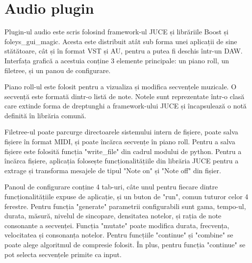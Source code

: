 \documentclass[11pt]{article}
\begin{document}
\section{Audio plugin}
Plugin-ul audio este scris folosind framework-ul JUCE și librăriile  Boost și foleys\_gui\_magic. Acesta este distribuit atât sub forma unei aplicații de sine stătătoare, cât și în format VST și AU, pentru a putea fi deschis într-un DAW. Interfața grafică a acestuia conține 3 elemente principale: un piano roll, un filetree, și un panou de configurare. \par 
Piano roll-ul este folosit pentru a vizualiza și modifica secvențele muzicale. O secvență este formată dintr-o listă de note. Notele sunt reprezentate într-o clasă care extinde forma de dreptunghi a framework-ului JUCE și încapsulează o notă definită în librăria comună. \par
Filetree-ul poate parcurge directoarele sistemului intern de fișiere, poate salva fișiere în format MIDI, și poate încărca secvențe în piano roll. Pentru a salva fișiere este folosită funcția "write\_file" din cadrul modului de python. Pentru a încărca fișiere, aplicația folosește funcționalitățiile din librăria JUCE pentru a extrage și transforma mesajele de tipul "Note on" și "Note off" din fișier. \par
Panoul de configurare conține 4 tab-uri, câte unul pentru fiecare dintre funcționalitățiile expuse de aplicație, și un buton de "run", comun tuturor celor 4 ferestre. Pentru funcția "generate" parametrii configurabili sunt gama, tempo-ul, durata, măsură, nivelul de sincopare, densitatea notelor, și rația de note consonante a secvenței. Funcția "mutate" poate modifica durata, frecvența, velocitatea și consonanța notelor. Pentru funcțiile "continue" și "combine" se poate alege algoritmul de compresie folosit. În plus, pentru funcția "continue" se pot selecta secvențele primite ca input.
\end{document}
